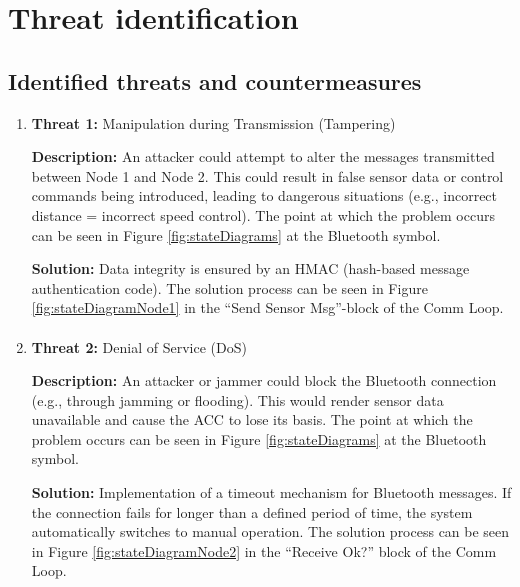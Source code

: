 \section{Threat identification}
\label{chapter5}

\subsection{Identified threats and countermeasures}


	\begin{enumerate}
		\item \textbf{Threat 1:} Manipulation during Transmission (Tampering)
            
            \textbf{Description:} An attacker could attempt to alter the messages transmitted between Node 1 and Node 2. This could result in false sensor data or control commands being introduced, leading to dangerous situations (e.g., incorrect distance = incorrect speed control). The point at which the problem occurs can be seen in Figure \ref{fig:stateDiagrams} at the Bluetooth symbol.
            
            \textbf{Solution:} Data integrity is ensured by an HMAC (hash-based message authentication code). The solution process can be seen in Figure \ref{fig:stateDiagramNode1} in the “Send Sensor Msg”-block of the Comm Loop.
        
        \paragraph{} 
		\item \textbf{Threat 2:} Denial of Service (DoS)
            
            \textbf{Description:} An attacker or jammer could block the Bluetooth connection (e.g., through jamming or flooding). This would render sensor data unavailable and cause the ACC to lose its basis. The point at which the problem occurs can be seen in Figure \ref{fig:stateDiagrams} at the Bluetooth symbol.
            
            \textbf{Solution:} Implementation of a timeout mechanism for Bluetooth messages. If the connection fails for longer than a defined period of time, the system automatically switches to manual operation. The solution process can be seen in Figure \ref{fig:stateDiagramNode2} in the “Receive Ok?” block of the Comm Loop.
        

\end{enumerate}
